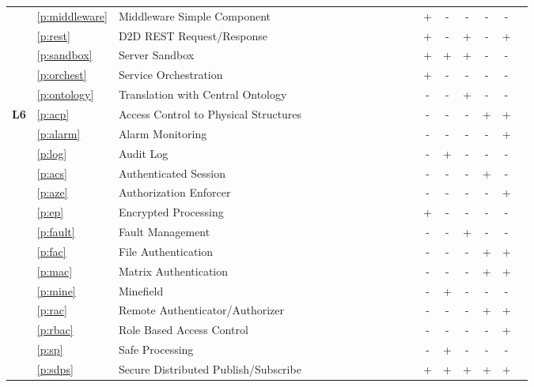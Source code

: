 \begin{landscape}
\begin{longtable}[c]{lllcccccccccccccccc}
	& \ref{p:middleware} & Middleware Simple Component & & & & & & & & & & & + & - & - & - & - \\
	& \ref{p:rest} & D2D REST Request/Response & & & \checkmark & & & & & & & & + & - & + & - & + \\
	& \ref{p:sandbox} & Server Sandbox & & & & & & & & & \checkmark & \checkmark & + & + & + & - & - \\ 
	& \ref{p:orchest} & Service Orchestration & & & \checkmark & & & & \checkmark & & & & + & - & - & - & - \\
	& \ref{p:ontology} & Translation with Central Ontology & & & \checkmark & & & & & & & & - & - & + & - & - \\
	\hline
	\multirow{15}{*}{\textbf{L6}} & \ref{p:acp} & Access Control to Physical Structures & & & & & & & & & & \checkmark & - & - & - & + & + \\
	& \ref{p:alarm} & Alarm Monitoring & & & & & & & & \checkmark & & & - & - & - & - & + \\
	& \ref{p:log} & Audit Log & & & & & & & & \checkmark & & & - & + & - & - & - \\  
	& \ref{p:acs} & Authenticated Session & & & \checkmark & & & & & & & & - & - & - & + & - \\
	& \ref{p:aze} & Authorization Enforcer & & & & & & & & \checkmark & & & - & - & - & - & + \\
	& \ref{p:ep} & Encrypted Processing & & & & & & & \checkmark & & & & + & - & - & - & - \\
	& \ref{p:fault} & Fault Management & & & & & & & & \checkmark & & & - & - & + & - & - \\ 
	& \ref{p:fac} & File Authentication & & & & & & & \checkmark & & & & - & - & - & + & + \\
	& \ref{p:mac} & Matrix Authentication & & & & & & & \checkmark & & & & - & - & - & + & + \\
	& \ref{p:mine} & Minefield & & & & & \checkmark & & & & \checkmark & & - & + & - & - & - \\
	& \ref{p:rac} & Remote Authenticator/Authorizer & & & & & & & \checkmark & & & & - & - & - & + & + \\
	& \ref{p:rbac} & Role Based Access Control & & & & & & & \checkmark & & & & - & - & - & - & + \\
	& \ref{p:sp} & Safe Processing & & & & & & & \checkmark & & & & - & + & - & - & - \\
	& \ref{p:sdps} & Secure Distributed Publish/Subscribe & & & & & & & \checkmark & & & & + & + & + & + & + \\

\end{longtable}
\end{landscape}
